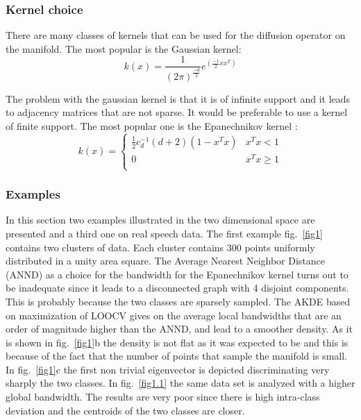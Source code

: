 \documentclass[12pt,letterpaper,doublespaced,ETD,dvips,proposal]{gtthesis}
\begin{document}
\begin{Body}
\subsubsection{Kernel choice} There are many classes of kernels that
can be used for the diffusion operator on the manifold. The most
popular is the Gaussian kernel:
\[
    k(x)=\frac{1}{(2\pi)^{\frac{-d}{2}}}e^{(\frac{-1}{2}xx^T)}
\]

The problem with the gaussian kernel is that it is of infinite
support and it leads to adjacency matrices that are not sparse. It
would be preferable to use a kernel of finite support. The most
popular one is the Epanechnikov kernel \cite{Silverman}:
\begin{equation}
    k(x)=\left\{
    \begin{array}{ll}
        \frac{1}{2}c_{d}^{-1}(d+2)(1-x^Tx) &  x^Tx<1 \\
        0   &   x^Tx\geq 1 \\
    \end{array}
 \right.
\end{equation}

\subsubsection{Examples} In this section two examples illustrated in
the two dimensional space are presented and a third one on real
speech data. The first example fig.~\ref{fig1} contains two clusters
of data. Each cluster contains 300 points uniformly distributed in a
unity area square. The Average Nearest Neighbor Distance (ANND) as a
choice for the bandwidth for the Epanechnikov kernel turns out to be
inadequate since it leads to a disconnected graph with 4 disjoint
components. This is probably because the two classes are sparsely
sampled. The AKDE based on maximization of LOOCV gives on the
average local bandwidths that are an order of magnitude higher than
the ANND, and lead to a smoother density. As it is shown in
fig.~\ref{fig1}b the density is not flat as it was expected to be
and this is because of the fact that the number of points that
sample the manifold is small. In fig.~\ref{fig1}c the first non
trivial eigenvector is depicted discriminating very sharply the two
classes. In fig.~\ref{fig1.1} the same data set is analyzed with a
higher global bandwidth. The results are very poor since there is
high intra-class deviation and the centroids of the two classes are
closer.


\end{Body}
\end{document}
